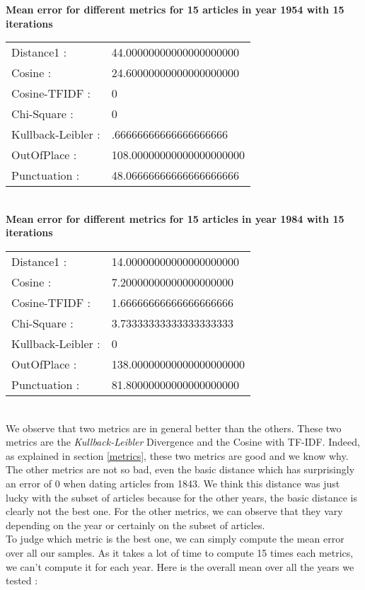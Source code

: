 \textbf{Mean error for different metrics for 15 articles in year 1954 with 15 iterations}\\
\begin{tabular}{p{3cm} p{5cm}}
    Distance1 :& 44.00000000000000000000\\
    Cosine :& 24.60000000000000000000\\
    Cosine-TFIDF :& 0\\
    Chi-Square :& 0\\
    Kullback-Leibler :& .66666666666666666666\\
    OutOfPlace :& 108.00000000000000000000\\
    Punctuation :& 48.06666666666666666666\\
\end{tabular}\\
 
\textbf{Mean error for different metrics for 15 articles in year 1984 with 15 iterations}\\
\begin{tabular}{p{3cm} p{5cm}}
    Distance1 :& 14.00000000000000000000\\
    Cosine :& 7.20000000000000000000\\
    Cosine-TFIDF :& 1.66666666666666666666\\
    Chi-Square :& 3.73333333333333333333\\
    Kullback-Leibler :& 0\\
    OutOfPlace :& 138.00000000000000000000\\
    Punctuation :& 81.80000000000000000000\\
\end{tabular}\\

We observe that two metrics are in general better than the others. These two metrics are the \emph{Kullback-Leibler} Divergence and the Cosine with TF-IDF. Indeed, as explained in section \ref{metrics}, these two metrics are good and we know why. The other metrics are not so bad, even the basic distance which has surprisingly an error of 0 when dating articles from 1843. We think this distance was just lucky with the subset of articles because for the other years, the basic distance is clearly not the best one. For the other metrics, we can observe that they vary depending on the year or certainly on the subset of articles.\\

To judge which metric is the best one, we can simply compute the mean error over all our samples. As it takes a lot of time to compute 15 times each metrics, we can't compute it for each year. Here is the overall mean over all the years we tested :\\

